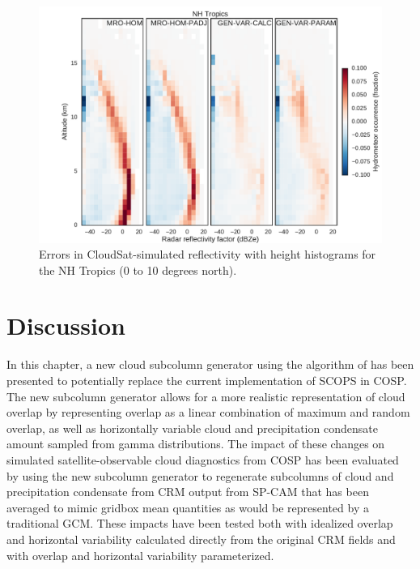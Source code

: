 \begin{figure}[htbp]
\centering
\includegraphics{graphics/subgrid2_cfadDbze94_NHTropics_all_diff.pdf}
\caption{\label{fig:subgrid2_cfadDbze94_NHTropics_all_diff}Errors in
CloudSat-simulated reflectivity with height histograms for the NH
Tropics (0 to 10 degrees
north).}\label{fig:subgrid2ux5fcfadDbze94ux5fNHTropicsux5fallux5fdiff}
\end{figure}

\section{Discussion}\label{sec:subgrid2Discussion}

In this chapter, a new cloud subcolumn generator using the algorithm of
\citet{raisanen_et_al_2004} has been presented to potentially replace
the current implementation of SCOPS in COSP. The new subcolumn generator
allows for a more realistic representation of cloud overlap by
representing overlap as a linear combination of maximum and random
overlap, as well as horizontally variable cloud and precipitation
condensate amount sampled from gamma distributions. The impact of these
changes on simulated satellite-observable cloud diagnostics from COSP
has been evaluated by using the new subcolumn generator to regenerate
subcolumns of cloud and precipitation condensate from CRM output from
SP-CAM that has been averaged to mimic gridbox mean quantities as would
be represented by a traditional GCM. These impacts have been tested both
with idealized overlap and horizontal variability calculated directly
from the original CRM fields and with overlap and horizontal variability
parameterized.


